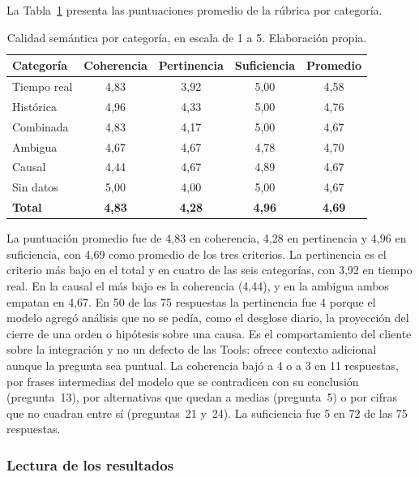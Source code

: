 La Tabla~\ref{tab:res_calidad} presenta las puntuaciones promedio de la rúbrica por categoría.

\begin{table}[H]
\centering
\caption{Calidad semántica por categoría, en escala de 1 a 5. Elaboración propia.}
\label{tab:res_calidad}
\small
\renewcommand{\arraystretch}{1.3}
\begin{tabular}{lcccc}
\hline
\textbf{Categoría} & \textbf{Coherencia} & \textbf{Pertinencia} & \textbf{Suficiencia} & \textbf{Promedio} \\
\hline
Tiempo real & 4,83 & 3,92 & 5,00 & 4,58 \\
Histórica & 4,96 & 4,33 & 5,00 & 4,76 \\
Combinada & 4,83 & 4,17 & 5,00 & 4,67 \\
Ambigua & 4,67 & 4,67 & 4,78 & 4,70 \\
Causal & 4,44 & 4,67 & 4,89 & 4,67 \\
Sin datos & 5,00 & 4,00 & 5,00 & 4,67 \\
\hline
\textbf{Total} & \textbf{4,83} & \textbf{4,28} & \textbf{4,96} & \textbf{4,69} \\
\hline
\end{tabular}
\end{table}

La puntuación promedio fue de 4,83 en coherencia, 4,28 en pertinencia y 4,96 en suficiencia, con 4,69 como promedio de los tres criterios. La pertinencia es el criterio más bajo en el total y en cuatro de las seis categorías, con 3,92 en tiempo real. En la causal el más bajo es la coherencia (4,44), y en la ambigua ambos empatan en 4,67. En 50 de las 75 respuestas la pertinencia fue 4 porque el modelo agregó análisis que no se pedía, como el desglose diario, la proyección del cierre de una orden o hipótesis sobre una causa. Es el comportamiento del cliente sobre la integración y no un defecto de las Tools: ofrece contexto adicional aunque la pregunta sea puntual. La coherencia bajó a 4 o a 3 en 11 respuestas, por frases intermedias del modelo que se contradicen con su conclusión (pregunta~13), por alternativas que quedan a medias (pregunta~5) o por cifras que no cuadran entre sí (preguntas~21 y~24). La suficiencia fue 5 en 72 de las 75 respuestas.

\subsubsection{Lectura de los resultados}
\label{lecturaresultados}

